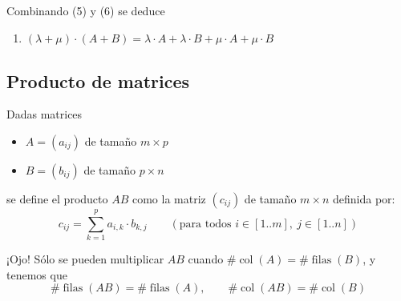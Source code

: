 \documentclass[11pt,a4paper]{article}
\begin{document}
\begin{observacion}
Combinando (5) y (6) se deduce
\begin{enumerate}[label=(\arabic*),start=7]
  \item $(\lambda+\mu)\cdot(A+B)=\lambda\cdot A+\lambda\cdot B+\mu\cdot A+\mu\cdot B$
\end{enumerate}
\end{observacion}

\subsection{Producto de matrices}

\begin{definicion}
Dadas matrices
\begin{itemize}
  \item $A=(a_{ij})$ de tamaño $m\times p$
  \item $B=(b_{ij})$ de tamaño $p\times n$
\end{itemize}
se define el producto $AB$ como la matriz $(c_{ij})$ de tamaño $m\times n$ definida por:
\[
c_{ij}=\sum_{k=1}^{p}a_{i,k}\cdot b_{k,j}\qquad(\text{para todos } i\in[1..m],\ j\in[1..n])
\]
\end{definicion}

¡Ojo! Sólo se pueden multiplicar $AB$ cuando $\#\operatorname{col}(A)=\#\operatorname{filas}(B)$, y tenemos que
\[
\#\operatorname{filas}(AB)=\#\operatorname{filas}(A),\qquad
\#\operatorname{col}(AB)=\#\operatorname{col}(B)
\]
\end{document}
